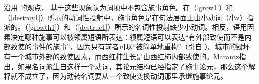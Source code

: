 \eal
\label{destroy1}
\zl

\eal
\label{destruc1}
\zl

\noindent
沿用 \citet{Chomsky70a}的观点， \citet{Marantz97a}基于这些现象认为词项中不包含施事角色。在（\ref{grow1}）和（\ref{destroy1}）所示的动词性投射中，施事角色是在句法层面上由小动词（小v）指派的。（\ref{growth1}）和（\ref{destruc1}）所示的名词性投射缺少小动词。相反，语用因素决定哪种施事可以被领属短语所表达：领属短语可以表达“有外部致使而不是内部致使的事件的施事”，因为只有前者可以“被简单地重构”（引自 \citet[]{Marantz97a}）。城市的毁坏有一个城市外部的致使因素，而西红柿生长是由西红柿内部致使的\citep{Smith70a-u}。Marantz指出，如果名词派生自这样一个动词，其论元结构已经指定了施事论元，那么这个解释就不成立了，因为动转名词要从一个致使变换动词那里承继施事论元。

